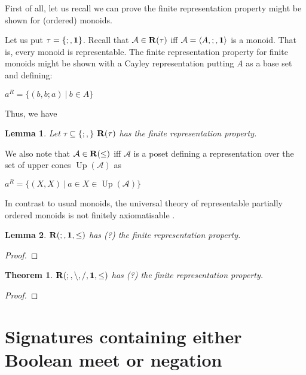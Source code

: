 \documentclass[a4paper]{article}
\theoremstyle{defin}
\theoremstyle{theorem}
\newtheorem{theorem}{Theorem}
\theoremstyle{prop}
\theoremstyle{lemma}
\newtheorem{lemma}{Lemma}
\theoremstyle{ex}
\theoremstyle{col}
\theoremstyle{claim}
\begin{document}
First of all, let us recall we can prove the finite representation property might be shown for (ordered) monoids.

Let us put $\tau = \{ ;, {\bf 1} \}$. Recall that $\mathcal{A} \in {\bf R}(\tau)$ iff $\mathcal{A} = \langle A, ;, {\bf 1} \rangle$ is a monoid. That is, every monoid is representable. The finite representation property for finite monoids might be shown with a Cayley representation putting $A$ as a base set and defining:
\begin{center}
  $a^R = \{ (b, b ; a) \: | \: b \in A \}$
\end{center}
Thus, we have
\begin{lemma}
  Let $\tau \subseteq \{ ;,  \}$ ${\bf R}(\tau)$ has the finite representation property.
\end{lemma}

We also note that $\mathcal{A} \in {\bf R}(\leq)$ iff $\mathcal{A}$ is a poset defining a representation over the set of upper cones
$\operatorname{Up}(\mathcal{A})$ as
\begin{center}
  $a^R = \{ (X,X) \: | \: a \in X \in \operatorname{Up}(\mathcal{A}) \}$
\end{center}

In contrast to usual monoids, the universal theory of representable partially ordered monoids is not finitely axiomatisable \cite{hirsch2005class}.

\begin{lemma}
  ${\bf R}(;, {\bf 1}, \leq)$ has (?) the finite representation property.
\end{lemma}

\begin{proof}

\end{proof}

\begin{theorem}
  ${\bf R}(;, \setminus, /, {\bf 1}, \leq)$ has (?) the finite representation property.
\end{theorem}

\begin{proof}
\end{proof}

\section{Signatures containing either Boolean meet or negation}
\end{document}
